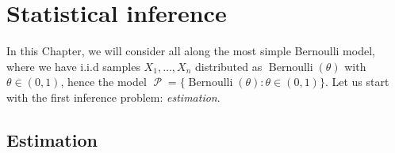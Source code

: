\documentclass[
	fontsize=11pt, %
	twoside=false, %
	numbers=noenddot, %
]{kaobook}
\DeclareMathOperator{\cP}{\mathcal P}
\DeclareMathOperator{\ber}{Bernoulli}
\begin{document}
\setchapterpreamble[u]{\margintoc}
\chapter{Statistical inference}
\label{chap:statistical_inference}

In this Chapter, we will consider all along the most simple Bernoulli model, where we have i.i.d samples $X_1, \ldots, X_n$ distributed as $\ber(\theta)$ with $\theta \in (0, 1)$, hence the model $\cP = \{ \ber(\theta) : \theta \in (0, 1) \}$.
Let us start with the first inference problem: \emph{estimation}.

\section{Estimation} %
\label{sec:estimation}
\end{document}
